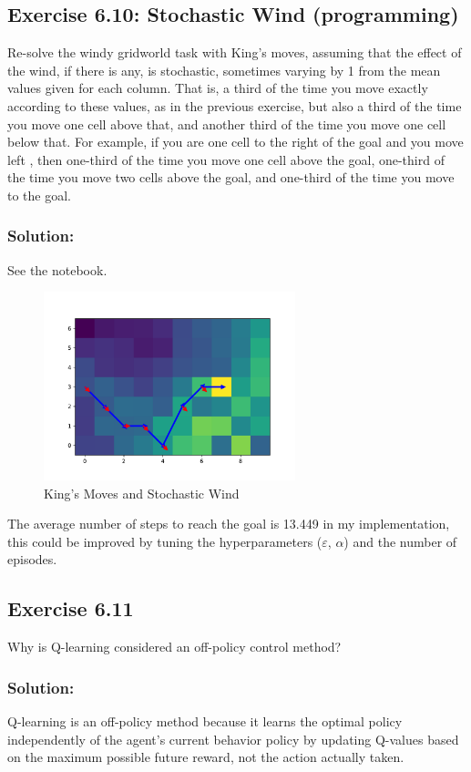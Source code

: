 \subsection*{Exercise 6.10: Stochastic Wind (programming)}
Re-solve the windy gridworld task with
King's moves, assuming that the effect of the wind, if there is any, is stochastic, sometimes
varying by 1 from the mean values given for each column. That is, a third of the time
you move exactly according to these values, as in the previous exercise, but also a third
of the time you move one cell above that, and another third of the time you move one
cell below that. For example, if you are one cell to the right of the goal and you move
left , then one-third of the time you move one cell above the goal, one-third of the time
you move two cells above the goal, and one-third of the time you move to the goal.

\subsubsection*{Solution:}
See the notebook.
\begin{figure}[H]
    \centering
    \includegraphics[width=0.65\textwidth]{chapters_latex/figures/ex_06_10.pdf}
    \captionsetup{labelformat=empty}
    \caption{King's Moves and Stochastic Wind}
\end{figure}

The average number of steps to reach the goal is 13.449 in my implementation, this could be improved by tuning the hyperparameters ($\varepsilon$, $\alpha$) and the number of episodes.

\subsection*{Exercise 6.11}
Why is Q-learning considered an off-policy control method?

\subsubsection*{Solution:}
Q-learning is an off-policy method because it learns the optimal policy independently of the
agent's current behavior policy by updating Q-values based on the maximum possible future reward, not the action actually taken.

